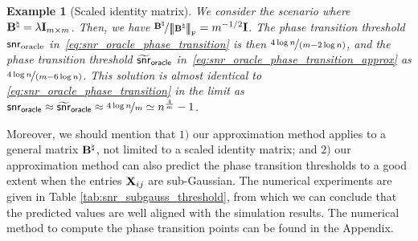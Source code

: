 \documentclass[11pt]{article}
\newtheorem{example}{Example}
\def \bBtrue {\bB^{\natural}}
\def \oracle{\mathsf{oracle}}
\begin{document}
\begin{example}[Scaled identity matrix] We consider the scenario
where
$\mathbf{B}^{\natural}=\lambda\mathbf{I}_{m\times m}$. Then, we have
$\nfrac{\bBtrue}{\Fnorm{\bBtrue}} = m^{-1/2}\bI$.
The phase transition threshold $\mathsf{snr}_{\textup{oracle}}$
in~\eqref{eq:snr_oracle_phase_transition} is
then  $\nicefrac{4\log n}{(m-2\log n)}$, and  the
phase transition threshold $\wt{\snr}_{\oracle}$
in~\eqref{eq:snr_oracle_phase_transition_approx}  as $\nicefrac{4\log n}{(m-6\log n)}$.
This solution is almost identical to \eqref{eq:snr_oracle_phase_transition} in the
 limit as
$\snr_{\oracle} \approx \wt{\snr}_{\oracle} \approx
\nfrac{4\log n}{m} \simeq n^{\frac{4}{m}} - 1$.
\end{example}




Moreover, we should mention that $1)$
our approximation method applies to a
general matrix $\bBtrue$, not limited to a
scaled identity matrix;
and $2)$ our approximation method can also predict the phase transition thresholds to a good extent when the entries $\mathbf{X}_{ij}$ are sub-Gaussian.
The numerical experiments are given in Table \ref{tab:snr_subgauss_threshold}, from which
we can conclude that the predicted values are well aligned with the simulation results.
The numerical method to compute the phase transition points can be found in the Appendix.
\end{document}
